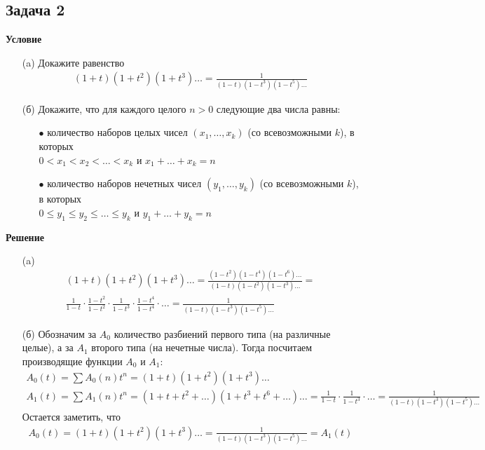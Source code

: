 	\subsection*{Задача 2}
	\noindent
	\textbf{Условие}
	\begin{enumerate}
	\item[(a)] Докажите равенство
		\begin{gather*}
			(1+t)(1+t^2)(1+t^3)\ldots = \frac{1}{(1-t)(1-t^3)(1-t^5)\ldots}
		\end{gather*}
	\item[(б)] Докажите, что для каждого целого $n>0$ следующие два числа равны:
		\begin{enumerate}
		\item[$\bullet$] количество наборов целых чисел $(x_1, \ldots, x_k)$ (со всевозможными $k$), в которых\\
		$0 < x_1 < x_2 < \ldots < x_k$ и $x_1 + \ldots + x_k = n$
		\item[$\bullet$] количество наборов нечетных чисел $(y_1,\ldots,y_k)$ (со всевозможными $k$), в которых\\
		$0 \leqslant y_1 \leqslant y_2 \leqslant \ldots \leqslant y_k$ и $y_1 + \ldots + y_k = n$
		\end{enumerate}
	\end{enumerate}
	\textbf{Решение}\\
	\begin{enumerate}
	\item[(a)] 
		\begin{gather*}
			(1+t)(1+t^2)(1+t^3)\ldots = 
			\frac{(1-t^2)(1-t^4)(1-t^6)\ldots}{(1-t)(1-t^2)(1-t^3)\ldots} =\\
			\frac{1}{1-t} \cdot \frac{1-t^2}{1-t^2} \cdot \frac{1}{1-t^3} \cdot \frac{1-t^4}{1-t^4} \cdot \ldots = 
			\frac{1}{(1-t)(1-t^3)(1-t^5)\ldots}
		\end{gather*}
	\item[(б)]
		Обозначим за $A_0$ количество разбиений первого типа (на различные целые), а за $A_1$ второго типа (на нечетные числа).
		Тогда посчитаем производящие функции $A_0$ и $A_1$:
		\begin{gather*}
			A_0(t) = \sum A_0(n) t^n = 
			(1+t)(1+t^2)(1+t^3)\ldots\\
			A_1(t) = \sum A_1(n) t^n = 
			(1+t+t^2+\ldots)(1+t^3+t^6+\ldots)\ldots = 
			\frac{1}{1-t} \cdot \frac{1}{1-t^3} \cdot \ldots = 
			\frac{1}{(1-t)(1-t^3)(1-t^5)\ldots}
		\end{gather*}
		Остается заметить, что
		\begin{gather*}
			A_0(t) = (1+t)(1+t^2)(1+t^3)\ldots = \frac{1}{(1-t)(1-t^3)(1-t^5)\ldots} = A_1(t)
		\end{gather*}
	\end{enumerate}
	
